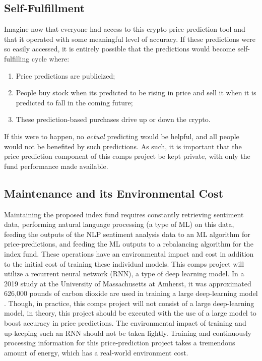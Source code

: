 \documentclass[10pt,twocolumn]{article}
\begin{document}
\subsection{Self-Fulfillment}

Imagine now that everyone had access to this crypto price prediction tool and that it operated with some meaningful level of accuracy. If these predictions were so easily accessed, it is entirely possible that the predictions would become self-fulfilling cycle where:

\begin{enumerate}
    \item Price predictions are publicized;
    \item People buy stock when its predicted to be rising in price and sell it when it is predicted to fall in the coming future;
    \item These prediction-based purchases drive up or down the crypto.
\end{enumerate}

If this were to happen, no \textit{actual} predicting would be helpful, and all people would not be benefited by such predictions. As such, it is important that the price prediction component of this comps project be kept private, with only the fund performance made available.

\subsection{Maintenance and its Environmental Cost}

Maintaining the proposed index fund requires constantly retrieving sentiment data, performing natural language processing (a type of ML) on this data, feeding the outputs of the NLP sentiment analysis data to an ML algorithm for price-predictions, and feeding the ML outputs to a rebalancing algorithm for the index fund. These operations have an environmental impact and cost in addition to the initial cost of training these individual models. This comps project will utilize a recurrent neural network (RNN), a type of deep learning model. In a 2019 study at the University of Massachusetts at Amherst, it was approximated 626,000 pounds of carbon dioxide are used in training a large deep-learning model \cite{ShrinkingDLCarbonFootprint}. Though, in practice, this comps project will not consist of a large deep-learning model, in theory, this project should be executed with the use of a large model to boost accuracy in price predictions. The environmental impact of training and up-keeping such an RNN should not be taken lightly. Training and continuously processing information for this price-prediction project takes a tremendous amount of energy, which has a real-world environment cost.
\end{document}
